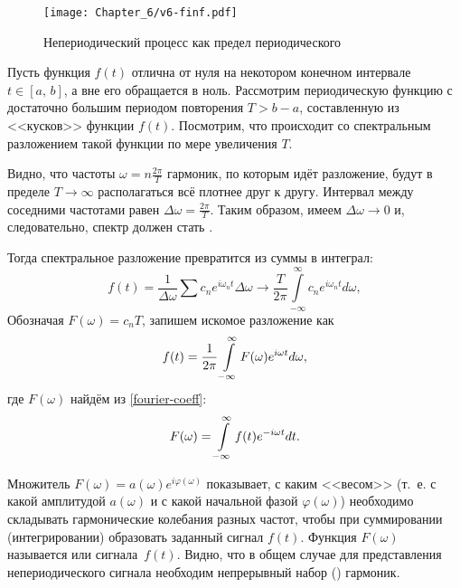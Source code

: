 \begin{wrapfigure}[9]{o}{0.5\textwidth}
    \centering\texttt{[image: Chapter\_6/v6-finf.pdf]}
    \caption{Непериодический процесс как предел периодического}
\end{wrapfigure}

Пусть функция $f(t)$ отлична от нуля на некотором конечном интервале
$t\in[a,\,b]$, а вне его обращается в ноль. Рассмотрим периодическую функцию
с достаточно большим периодом повторения $T>b-a$, составленную из <<кусков>>
функции $f(t)$. Посмотрим, что происходит со спектральным разложением
такой функции по мере увеличения $T$.

Видно, что частоты $\omega = n \frac{2\pi}{T}$ гармоник, по которым идёт
разложение, будут в пределе $T\to \infty$ располагаться всё плотнее друг к другу.
Интервал между соседними частотами равен $\Delta \omega = \frac{2\pi}{T}$.
Таким образом, имеем $\Delta \omega\to 0$ и, следовательно,
спектр должен стать .

Тогда спектральное разложение превратится из суммы в интеграл:
\begin{equation*}
 f(t) = \frac{1}{\Delta \omega}\sum c_n e^{i\omega_n t} \Delta \omega \to
 \frac{T}{2\pi} \int\limits_{-\infty}^{\infty} c_n e^{i\omega_n t} d\omega,
\end{equation*}
Обозначая $F(\omega)=c_n T$, запишем искомое разложение как
\begin{equation}
\eqmark{Fourier integral}
f(t) = \frac{1}{2\pi} \int\limits_{-\infty}^{\infty} F(\omega) e^{i\omega t} d\omega,
\end{equation}
где $F(\omega)$ найдём из \eqref{fourier-coeff}:
\begin{equation}
\eqmark{Fourier integral-coef}
 F(\omega) =
\int\limits_{-\infty}^{\infty} f(t) e^{-i\omega t} dt.
\end{equation}

Множитель $F(\omega)=a(\omega)e^{i\varphi(\omega)}$ показывает, с каким
<<весом>> (т.~е. с какой амплитудой $a(\omega)$ и с какой начальной фазой
$\varphi(\omega)$) необходимо складывать гармонические
колебания разных частот, чтобы при суммировании (интегрировании) образовать
заданный сигнал $f(t)$. Функция $F(\omega)$ называется 
или  сигнала~$f(t)$.
Видно, что в общем случае для представления
непериодического сигнала необходим непрерывный набор () гармоник.

